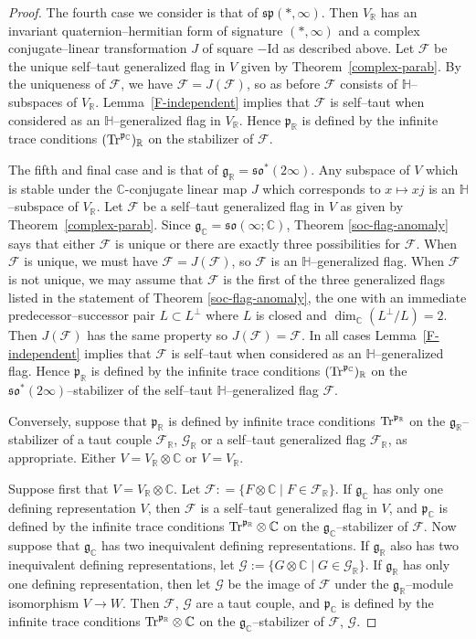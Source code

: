 \documentclass[oneside,leqno,11pt]{article}
\def\gg{\mathfrak{g}}
\def\gp{\mathfrak{p}}
\def\gso{\mathfrak{so}}
\def\gsp{\mathfrak{sp}}
\def\Tr{{\rm Tr}}
\def\C{\mathbb{C}}
\def\H{\mathbb{H}}
\def\R{\mathbb{R}}
\def\cF{\mathcal{F}}
\def\cG{\mathcal{G}}
\begin{document}
\begin{proof}
The fourth case we consider is that of $\gsp(*,\infty)$.
Then $V_\R$ has an invariant quaternion--hermitian form of signature $(*,\infty)$ and a complex conjugate--linear transformation $J$ of square $-\mathrm{Id}$ as described above.
Let $\cF$ be the unique self--taut generalized flag in $V$ given by Theorem~\ref{complex-parab}.
By the uniqueness of $\cF$, we have $\cF = J(\cF)$,
so as before $\cF$ consists of $\H$--subspaces of $V_\R$.  Lemma~\ref{F-independent} implies that $\cF$ is self--taut when considered as an $\H$--generalized flag in $V_\R$.  Hence $\gp_\R$ is defined by the infinite trace conditions $(\Tr^{\gp_\C})_\R$ on the stabilizer of $\cF$.

The fifth and final case and is that of $\gg_\R = \gso^*(2\infty)$.
Any subspace of $V$ which is stable under  the $\C$-conjugate linear 
map $J$ which corresponds to $x \mapsto xj$ is an $\H$--subspace of $V_\R$.
Let $\cF$ be a self--taut generalized flag in $V$ as given by 
Theorem~\ref{complex-parab}.  Since $\gg_\C = \gso(\infty;\C)$, 
Theorem \ref{soc-flag-anomaly} says that either $\cF$ is unique or there 
are exactly three possibilities for $\cF$.  When $\cF$ is unique, we 
must have $\cF = J(\cF)$, so $\cF$ is an $\H$--generalized flag.
When $\cF$ is not unique, we may assume that $\cF$ is the first of the 
three generalized flags listed in the statement of Theorem 
\ref{soc-flag-anomaly}, the one with an immediate predecessor--successor 
pair $L \subset L^\perp$ where $L$ is closed and $\dim_\C (L^\perp / L) = 2$.
Then $J(\cF)$ has the same property so $J(\cF) = \cF$.  In all cases 
Lemma~\ref{F-independent} implies that $\cF$ is self--taut when considered 
as an $\H$--generalized flag.  Hence $\gp_\R$ is defined by the infinite 
trace conditions $(\Tr^{\gp_\C})_\R$ on the $\gso^*(2\infty)$--stabilizer 
of the self--taut $\H$--generalized flag $\cF$.

Conversely, suppose that $\gp_\R$ is defined by infinite trace conditions $\Tr^{\gp_\R}$ on the $\gg_\R$--stabilizer of a taut couple $\cF_\R$, $\cG_\R$ or a self--taut generalized flag $\cF_\R$, as appropriate.  Either $V = V_\R \otimes \C$ or $V = V_\R$.

Suppose first that $V = V_\R \otimes \C$.  Let $\cF : = \{ F \otimes \C \mid F \in \cF_\R \}$.  If $\gg_\C$ has only one defining representation $V$, then $\cF$ is a self--taut generalized flag in $V$, and $\gp_\C$ is 
defined by the infinite trace conditions $\Tr^{\gp_\R} \otimes \C$ on the $\gg_\C$--stabilizer of $\cF$.  
Now suppose that $\gg_\C$ has two inequivalent defining representations.  If $\gg_\R$ also has two inequivalent defining representations, let $\cG := \{ G \otimes \C \mid G \in \cG_\R \}$.  If $\gg_\R$ has only one defining representation, then let $\cG$ be the image of $\cF$ under the $\gg_\R$--module isomorphism $V \to W$.  Then $\cF$, $\cG$ are a taut couple, and $\gp_\C$ is defined by the infinite trace conditions $\Tr^{\gp_\R} \otimes \C$ on the $\gg_\C$--stabilizer of $\cF$, $\cG$.


\end{proof}
\end{document}
